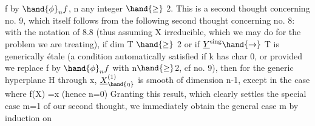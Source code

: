 f by $\hand{\phi}_{n}f$, n any integer $\hand{\geq}$ 2. This is a second thought concerning no. 9,
which itself follows from the following second thought concerning no. 8: with the notation of
8.8 (thus assuming X irreducible, which we may do for the problem
we are treating), if dim T $\hand{\geq}$ 2 or if $\underline{Y}^{\text{sing}}\hand{\rightarrow}$ T is
generically étale (a condition automatically satisfied if k has char 0,
or provided we replace f by $\hand{\phi}_{n}f$ with n$\hand{\geq}$2, cf no. 9), then for
the  generic hyperplane H\hand{$_{\eta}$} through x,  $\underline{X}^{(1)}_{\hand{\eta}}$ is smooth
of dimension n-1, except in the case where f(X) =\hand{$\{$}x\hand{$\}$} (hence n=0)
Granting this result, \hand{(}which clearly settles the special case m=1 of
our second thought, we immediately obtain the general case m by induction on

